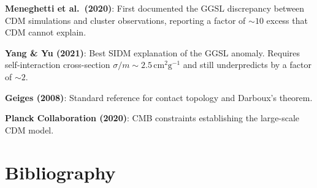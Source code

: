 \documentclass[11pt,a4paper,openright]{book}
\theoremstyle{dm3thm}
\theoremstyle{dm3def}
\begin{document}
\textbf{Meneghetti et al.\ (2020)}: First documented the GGSL discrepancy
between CDM simulations and cluster observations, reporting a factor of
$\sim 10$ excess that CDM cannot explain.

\textbf{Yang \& Yu (2021)}: Best SIDM explanation of the GGSL anomaly.
Requires self-interaction cross-section $\sigma/m \sim 2.5\,\mathrm{cm}^2\mathrm{g}^{-1}$
and still underpredicts by a factor of $\sim 2$.

\textbf{Geiges (2008)}: Standard reference for contact topology and Darboux's
theorem.

\textbf{Planck Collaboration (2020)}: CMB constraints establishing the
large-scale CDM model.

\backmatter
\chapter*{Bibliography}
\end{document}

